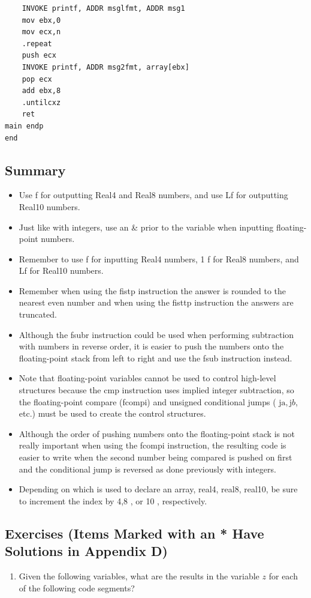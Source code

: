 \documentclass[10pt]{book}
\begin{document}
\begin{verbatim}
    INVOKE printf, ADDR msglfmt, ADDR msg1
    mov ebx,0
    mov ecx,n
    .repeat
    push ecx
    INVOKE printf, ADDR msg2fmt, array[ebx]
    pop ecx
    add ebx,8
    .untilcxz
    ret
main endp
end
\end{verbatim}

\subsection{Summary}
\begin{itemize}
  \item Use f for outputting Real4 and Real8 numbers, and use Lf for outputting Real10 numbers.
  \item Just like with integers, use an \& prior to the variable when inputting floating-point numbers.
  \item Remember to use f for inputting Real4 numbers, 1 f for Real8 numbers, and Lf for Real10 numbers.
  \item Remember when using the fistp instruction the answer is rounded to the nearest even number and when using the fisttp instruction the answers are truncated.
  \item Although the fsubr instruction could be used when performing subtraction with numbers in reverse order, it is easier to push the numbers onto the floating-point stack from left to right and use the fsub instruction instead.
  \item Note that floating-point variables cannot be used to control high-level structures because the cmp instruction uses implied integer subtraction, so the floating-point compare (fcompi) and unsigned conditional jumps ( $\mathrm{ja}, \mathrm{j} b$, etc.) must be used to create the control structures.
  \item Although the order of pushing numbers onto the floating-point stack is not really important when using the fcompi instruction, the resulting code is easier to write when the second number being compared is pushed on first and the conditional jump is reversed as done previously with integers.
  \item Depending on which is used to declare an array, real4, real8, real10, be sure to increment the index by 4,8 , or 10 , respectively.
\end{itemize}

\subsection{Exercises (Items Marked with an * Have Solutions in Appendix D)}
\begin{enumerate}
  \item Given the following variables, what are the results in the variable $z$ for each of the following code segments?
\end{enumerate}
\end{document}
